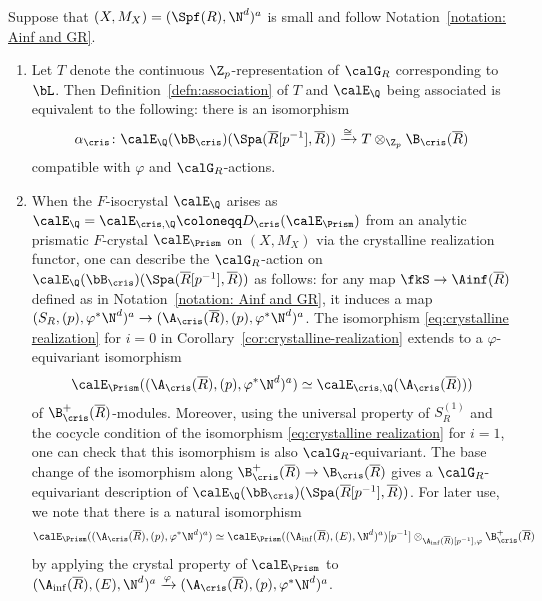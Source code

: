 \begin{rem}\label{rem:GaloisactiononcrysllinerealizationoverAcris}
Suppose that $(X,M_X)=(\Spf(R),\N^d)^a$ is small and follow Notation~\ref{notation: Ainf and GR}.
\begin{enumerate}
    \item 
Let $T$ denote the continuous $\Z_p$-representation of $\calG_R$ corresponding to $\bL$. Then Definition~\ref{defn:association} of $T$ and $\calE_\Q$ being associated is equivalent to the following: there is an isomorphism
\[
\alpha_{\cris}\colon \calE_\Q(\bB_{\cris})(\Spa(\overline{R}[p^{-1}], \overline{R})) \xrightarrow{\cong} T\otimes_{\Z_p}\B_\cris(\overline{R})
\]
compatible with $\varphi$ and $\calG_R$-actions.
\item When the $F$-isocrystal $\calE_\Q$ arises as 
 $\calE_\Q=\calE_{\cris,\Q}\coloneqq D_\cris(\calE_\Prism)$ from an analytic prismatic $F$-crystal $\calE_\Prism$ on $(X,M_X)$ via the crystalline realization functor, one can describe the $\calG_R$-action on $\calE_\Q(\bB_{\cris})(\Spa(\overline{R}[p^{-1}], \overline{R}))$ as follows:
for any map $\fkS \to \Ainf(\overline{R})$ defined as in Notation~\ref{notation: Ainf and GR}, it induces a map $(S_R,(p),\varphi^\ast\N^d)^a \to (\A_{\cris}(\overline{R}),(p),\varphi^\ast\N^d)^a$. The isomorphism \eqref{eq:crystalline realization} for $i=0$ in Corollary~\ref{cor:crystalline-realization} extends to a $\varphi$-equivariant isomorphism
\[
\calE_\Prism((\A_{\cris}(\overline{R}),(p),\varphi^\ast\N^d)^a)\simeq \calE_{\cris,\Q}(\A_{\cris}(\overline{R})))
\]
of $\B_{\cris}^+(\overline{R})$-modules.
Moreover, using the universal property of $S_R^{(1)}$ and the cocycle condition of the isomorphism \eqref{eq:crystalline realization} for $i=1$, one can check that this isomorphism is also $\calG_R$-equivariant.
The base change of the isomorphism along $\B_{\cris}^+(\overline{R})\rightarrow\B_{\cris}(\overline{R})$ gives a $\calG_R$-equivariant description of $\calE_\Q(\bB_{\cris})(\Spa(\overline{R}[p^{-1}], \overline{R}))$.
For later use, we note that there is a natural isomorphism 
\[
\calE_\Prism((\A_{\cris}(\overline{R}),(p),\varphi^\ast\N^d)^a)\simeq \calE_\Prism((\A_{\inf}(\overline{R}),(E),\N^d)^a)[p^{-1}] \otimes_{\A_{\inf}(\overline{R})[p^{-1}],\varphi} \B_{\cris}^+(\overline{R})
\]
by applying the crystal property of $\calE_\Prism$ to $(\A_{\inf}(\overline{R}),(E),\N^d)^a \xrightarrow{\varphi}(\A_{\cris}(\overline{R}),(p),\varphi^\ast\N^d)^a$.
\end{enumerate}
\end{rem}


